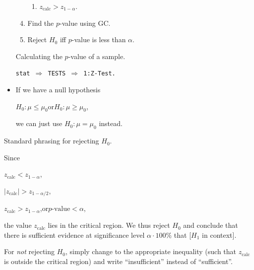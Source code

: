 \documentclass[../Notes.tex]{subfiles}
\begin{document}
\begin{stbox}{}
\begin{itemize}
\begin{minipage}[t]{0.45\textwidth}
\begin{enumerate}
\begin{enumerate}
            \item \(z_\text{calc}>z_{1-\alpha}\).
          \end{enumerate}
        \end{enumerate}
      \end{minipage}
      \begin{minipage}[t]{0.45\textwidth}
        \begin{enumerate}
          \setcounter{enumi}{3}
          \item Find the \(p\)-value using GC.
          \item Reject \(H_0\) iff \(p\)-value is less than \(\alpha\).
        \end{enumerate}
        \vfill
        \begin{GCSkills}{}
          Calculating the \(p\)-value of a sample.
          \begin{center}
            \texttt{stat \(\Longrightarrow\) TESTS \(\Longrightarrow\) 1:Z-Test.}
          \end{center}
        \end{GCSkills}
      \end{minipage}
      \item If we have a null hypothesis
      \begin{center}
        \(H_0\colon\mu\leq\mu_0\)\quad or\quad \(H_0\colon\mu\geq\mu_0\),
      \end{center}
      we can just use \(H_0\colon\mu=\mu_0\) instead.
  \end{itemize}
\end{stbox}
\begin{note}
  Standard phrasing for rejecting \(H_0\).
  \begin{center}
    \parbox{0.9\textwidth}{
      Since\quad
      \begin{enumerate*}[label=(\alph*),itemjoin={\quad}]
        \item \(z_\text{calc}<z_{1-\alpha}\),
        \item \(\lvert z_\text{calc} \rvert>z_{1-\alpha/2}\),
        \item \(z_\text{calc}>z_{1-\alpha}\),\quad or\quad \(p\text{-value}<\alpha\),
      \end{enumerate*}
      the value \(z_\text{calc}\) lies in the critical region. We thus reject \(H_0\) and conclude that there is sufficient evidence at significance level \(\alpha\cdot 100\%\) that [\(H_1\) in context].}
  \end{center}
  For \emph{not} rejecting \(H_0\), simply change to the appropriate inequality (such that \(z_\text{calc}\) is outside the critical region) and write ``insufficient'' instead of ``sufficient''.
\end{note}
\end{document}
